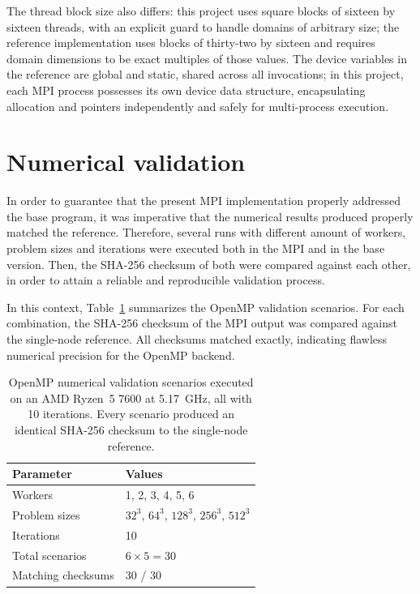 \documentclass[cic,tc,english]{infufrgs}
\begin{document}
The thread block size also differs: this project uses square blocks of
sixteen by sixteen threads, with an explicit guard to handle domains of
arbitrary size; the reference implementation uses blocks of thirty-two
by sixteen and requires domain dimensions to be exact multiples of
those values. The device variables in the reference are global and
static, shared across all invocations; in this project, each MPI
process possesses its own device data structure, encapsulating
allocation and pointers independently and safely for multi-process
execution.

\section{Numerical validation}
In order to guarantee that the present MPI implementation properly
addressed the base
program, it was imperative that the numerical results produced
properly matched the reference. Therefore, several runs with different
amount of workers, problem sizes and iterations were executed both in the
MPI and in the base version. Then, the SHA-256 checksum of both were
compared against each other, in order to attain a reliable and reproducible
validation process.

In this context, Table~\ref{tab:openmp_validation} summarizes the
OpenMP validation scenarios. For each combination, the SHA-256
checksum of the MPI output was compared against the single-node
reference. All checksums matched exactly, indicating flawless
numerical precision for the OpenMP backend.

\begin{table}[H]
  \centering
  \caption{OpenMP numerical validation scenarios executed on an AMD
    Ryzen~5 7600 at 5.17~GHz, all with 10 iterations. Every scenario
  produced an identical SHA-256 checksum to the single-node reference.}
  \label{tab:openmp_validation}
  \begin{tabular}{ll}
    \hline
    Parameter & Values \\
    \hline
    Workers       & 1, 2, 3, 4, 5, 6 \\
    Problem sizes & $32^3$, $64^3$, $128^3$, $256^3$, $512^3$ \\
    Iterations    & 10 \\
    \hline
    Total scenarios & $6 \times 5 = 30$ \\
    Matching checksums & 30 / 30 \\
    \hline
  \end{tabular}
\end{table}
\end{document}
